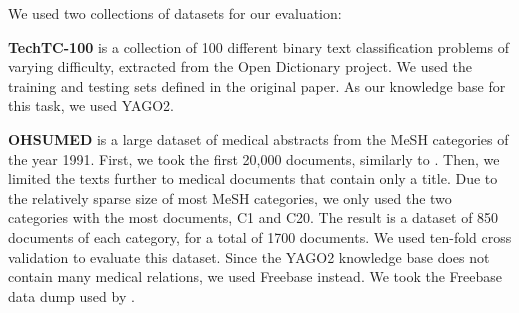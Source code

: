 \documentclass{article}
\theoremstyle{definition}
\begin{document}
We used two collections of datasets for our evaluation:

\textbf{TechTC-100} \citep{gabrilovich2004text} is a collection of 100 different binary text classification problems of varying difficulty, extracted from the Open Dictionary project.
We used the training and testing sets defined in the original paper. 
As our knowledge base for this task, we used YAGO2.%




\textbf{OHSUMED} \citep{hersh1994ohsumed} is a large dataset of medical abstracts from the MeSH categories of the year 1991. 
First, we took the first 20,000 documents, similarly to \cite{joachims1998text}.
Then, we limited the texts further to medical documents that contain only a title. %
Due to the relatively sparse size of most MeSH categories, we only used the two categories with the most documents, C1 and C20. %
The result is a dataset of 850 documents of each category, for a total of 1700 documents.
We used ten-fold cross validation to evaluate this dataset.
Since the YAGO2 knowledge base does not contain many medical relations, we used Freebase instead. We took the Freebase data dump used by \cite{bast2014easy}. 
\end{document}
